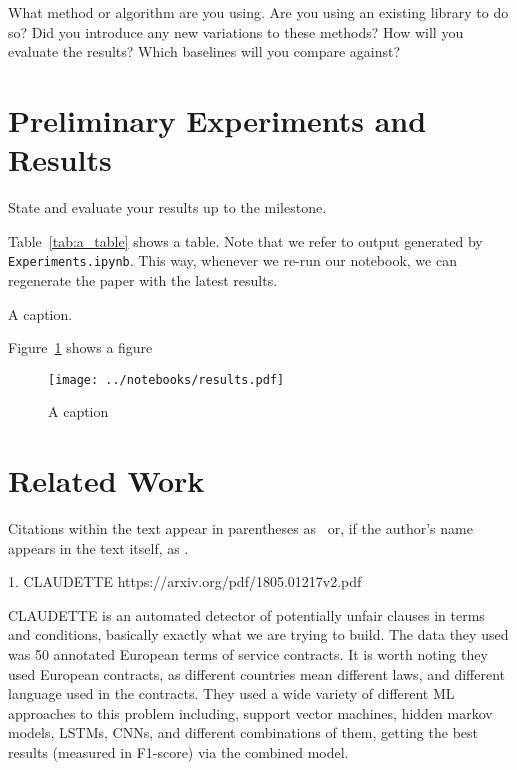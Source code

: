 \documentclass[11pt,a4paper]{article}
\begin{document}
What method or algorithm are you using. 
Are you using an existing library to do so? 
Did you introduce any new variations to these methods? 
How will you evaluate the results? 
Which baselines will you compare against?


\section{Preliminary Experiments and Results}

State and evaluate your results up to the milestone.

Table~\ref{tab:a_table} shows a table. Note that we refer to output generated by \texttt{Experiments.ipynb}. This way, whenever we re-run our notebook, we can regenerate the paper with the latest results.

\begin{table}[ht]
\centering

\caption{\label{tab:a_table} A caption. }
\end{table}

Figure~\ref{fig:a_label} shows a figure

\begin{figure}[ht]
	\centering
	\texttt{[image: ../notebooks/results.pdf]}
	\caption{A caption}
	\label{fig:a_label}
\end{figure}

\section{Related Work}

Citations within the text appear in parentheses as~\citep{aho1972theory} or, if the author's name appears in the text itself, as \citet{andrew2007scalable}.

1. CLAUDETTE
https://arxiv.org/pdf/1805.01217v2.pdf

CLAUDETTE is an automated detector of potentially unfair clauses in terms and conditions, basically exactly what we are trying to build. The data they used was 50 annotated European terms of service contracts. It is worth noting they used European contracts, as different countries mean different laws, and different language used in the contracts. They used a wide variety of different ML approaches to this problem including, support vector machines, hidden markov models, LSTMs, CNNs, and different combinations of them, getting the best results (measured in F1-score) via the combined model.  
\end{document}
